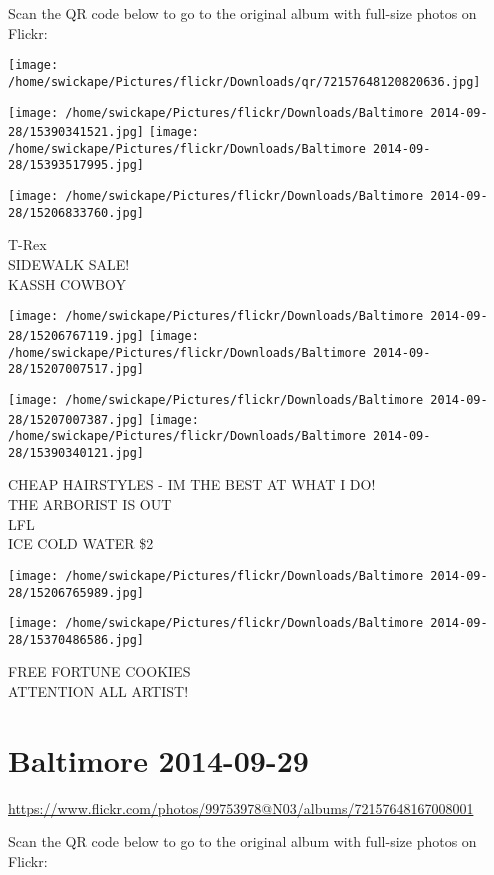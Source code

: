 \documentclass[10pt,letterpaper]{article}
\begin{document}
Scan the QR code below to go to the original album with full-size photos on Flickr:

\texttt{[image: /home/swickape/Pictures/flickr/Downloads/qr/72157648120820636.jpg]}
\pagebreak

\texttt{[image: /home/swickape/Pictures/flickr/Downloads/Baltimore 2014-09-28/15390341521.jpg]}
\texttt{[image: /home/swickape/Pictures/flickr/Downloads/Baltimore 2014-09-28/15393517995.jpg]}

\vspace{0.25in}
\texttt{[image: /home/swickape/Pictures/flickr/Downloads/Baltimore 2014-09-28/15206833760.jpg]}

T{-}Rex\\
SIDEWALK SALE!\\
KASSH COWBOY
\pagebreak

\texttt{[image: /home/swickape/Pictures/flickr/Downloads/Baltimore 2014-09-28/15206767119.jpg]}
\texttt{[image: /home/swickape/Pictures/flickr/Downloads/Baltimore 2014-09-28/15207007517.jpg]}

\texttt{[image: /home/swickape/Pictures/flickr/Downloads/Baltimore 2014-09-28/15207007387.jpg]}
\texttt{[image: /home/swickape/Pictures/flickr/Downloads/Baltimore 2014-09-28/15390340121.jpg]}

CHEAP HAIRSTYLES {-} IM THE BEST AT WHAT I DO!\\
THE ARBORIST IS OUT\\
LFL\\
ICE COLD WATER \$2
\pagebreak

\texttt{[image: /home/swickape/Pictures/flickr/Downloads/Baltimore 2014-09-28/15206765989.jpg]}

\vspace{0.25in}
\texttt{[image: /home/swickape/Pictures/flickr/Downloads/Baltimore 2014-09-28/15370486586.jpg]}

FREE FORTUNE COOKIES\\
ATTENTION ALL ARTIST!
\pagebreak

\section*{Baltimore 2014-09-29}

\url{https://www.flickr.com/photos/99753978@N03/albums/72157648167008001}

Scan the QR code below to go to the original album with full-size photos on Flickr:
\end{document}
